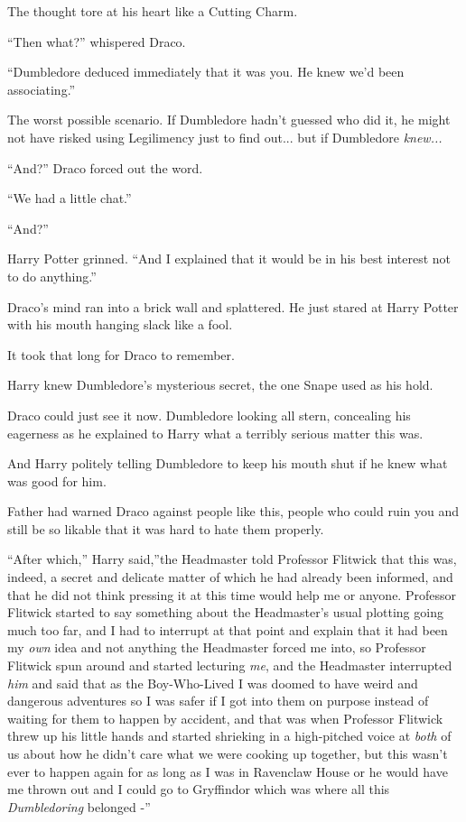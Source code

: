 The thought tore at his heart like a Cutting Charm.

``Then what?'' whispered Draco.

``Dumbledore deduced immediately that it was you. He knew we'd been
associating.''

The worst possible scenario. If Dumbledore hadn't guessed who did it, he
might not have risked using Legilimency just to find out... but if
Dumbledore \emph{knew...}

``And?'' Draco forced out the word.

``We had a little chat.''

``And?''

Harry Potter grinned. ``And I explained that it would be in his best
interest not to do anything.''

Draco's mind ran into a brick wall and splattered. He just stared at
Harry Potter with his mouth hanging slack like a fool.

It took that long for Draco to remember.

Harry knew Dumbledore's mysterious secret, the one Snape used as his
hold.

Draco could just see it now. Dumbledore looking all stern, concealing
his eagerness as he explained to Harry what a terribly serious matter
this was.

And Harry politely telling Dumbledore to keep his mouth shut if he knew
what was good for him.

Father had warned Draco against people like this, people who could ruin
you and still be so likable that it was hard to hate them properly.

``After which,'' Harry said,''the Headmaster told Professor Flitwick
that this was, indeed, a secret and delicate matter of which he had
already been informed, and that he did not think pressing it at this
time would help me or anyone. Professor Flitwick started to say
something about the Headmaster's usual plotting going much too far, and
I had to interrupt at that point and explain that it had been my
\emph{own} idea and not anything the Headmaster forced me into, so
Professor Flitwick spun around and started lecturing \emph{me}, and the
Headmaster interrupted \emph{him} and said that as the Boy-Who-Lived I
was doomed to have weird and dangerous adventures so I was safer if I
got into them on purpose instead of waiting for them to happen by
accident, and that was when Professor Flitwick threw up his little hands
and started shrieking in a high-pitched voice at \emph{both} of us about
how he didn't care what we were cooking up together, but this wasn't
ever to happen again for as long as I was in Ravenclaw House or he would
have me thrown out and I could go to Gryffindor which was where all this
\emph{Dumbledoring} belonged -''

